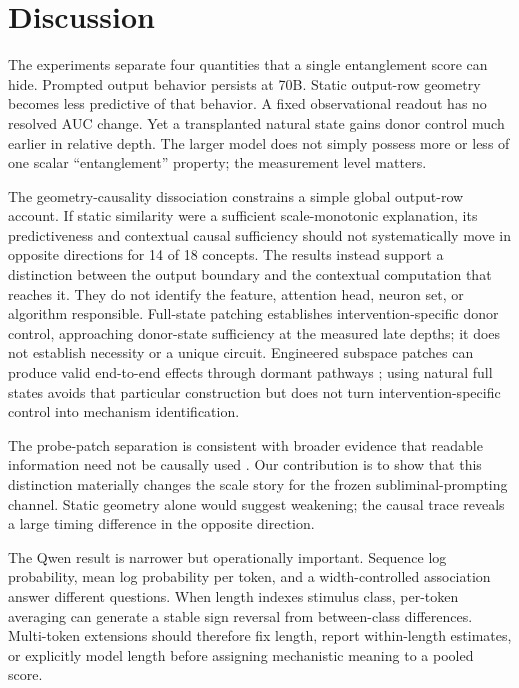\documentclass[letterpaper]{article}
\begin{document}
\section{Discussion}

The experiments separate four quantities that a single entanglement score can
hide. Prompted output behavior persists at 70B. Static output-row geometry
becomes less predictive of that behavior. A fixed observational readout has no
resolved AUC change. Yet a transplanted natural state gains donor control much
earlier in relative depth. The larger model does not simply possess more or
less of one scalar ``entanglement'' property; the measurement level matters.

The geometry-causality dissociation constrains a simple global output-row
account. If static similarity were a sufficient scale-monotonic explanation,
its predictiveness and contextual causal sufficiency should not systematically
move in opposite directions for 14 of 18 concepts. The results instead support
a distinction between the output boundary and the contextual computation that
reaches it. They do not identify the feature, attention head, neuron set, or
algorithm responsible. Full-state patching establishes intervention-specific
donor control, approaching donor-state sufficiency at the measured late depths;
it does not establish necessity or a unique circuit.
Engineered subspace patches can produce valid end-to-end effects through
dormant pathways \citep{makelov2024subspace}; using natural full states avoids
that particular construction but does not turn intervention-specific control
into mechanism identification.

The probe-patch separation is consistent with broader evidence that readable
information need not be causally used \citep{belinkov2022probing,ma2026plan}.
Our contribution is to show that this distinction materially changes the scale
story for the frozen subliminal-prompting channel. Static geometry alone would
suggest weakening; the causal trace reveals a large timing difference in the
opposite direction.

The Qwen result is narrower but operationally important. Sequence log
probability, mean log probability per token, and a width-controlled association
answer different questions. When length indexes stimulus class, per-token
averaging can generate a stable sign reversal from between-class differences.
Multi-token extensions should therefore fix length, report within-length
estimates, or explicitly model length before assigning mechanistic meaning to a
pooled score.
\end{document}
